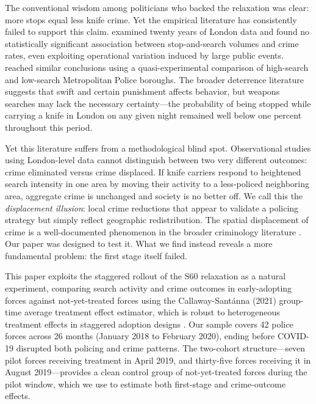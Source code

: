\documentclass[12pt]{article}
\begin{document}
The conventional wisdom among politicians who backed the relaxation was clear: more stops equal less knife crime. Yet the empirical literature has consistently failed to support this claim. \citet{tiratelli2018} examined twenty years of London data and found no statistically significant association between stop-and-search volumes and crime rates, even exploiting operational variation induced by large public events. \citet{mccandless2016} reached similar conclusions using a quasi-experimental comparison of high-search and low-search Metropolitan Police boroughs. The broader deterrence literature \citep{nagin2013, chalfin2018} suggests that swift and certain punishment affects behavior, but weapons searches may lack the necessary certainty---the probability of being stopped while carrying a knife in London on any given night remained well below one percent throughout this period.

Yet this literature suffers from a methodological blind spot. Observational studies using London-level data cannot distinguish between two very different outcomes: crime eliminated versus crime displaced. If knife carriers respond to heightened search intensity in one area by moving their activity to a less-policed neighboring area, aggregate crime is unchanged and society is no better off. We call this the \textit{displacement illusion}: local crime reductions that appear to validate a policing strategy but simply reflect geographic redistribution. The spatial displacement of crime is a well-documented phenomenon in the broader criminology literature \citep{weisburd2006, johnson2014}. Our paper was designed to test it. What we find instead reveals a more fundamental problem: the first stage itself failed.

This paper exploits the staggered rollout of the S60 relaxation as a natural experiment, comparing search activity and crime outcomes in early-adopting forces against not-yet-treated forces using the Callaway-Sant\'{a}nna (2021) group-time average treatment effect estimator, which is robust to heterogeneous treatment effects in staggered adoption designs \citep{callaway2021}. Our sample covers 42 police forces across 26 months (January 2018 to February 2020), ending before COVID-19 disrupted both policing and crime patterns. The two-cohort structure---seven pilot forces receiving treatment in April 2019, and thirty-five forces receiving it in August 2019---provides a clean control group of not-yet-treated forces during the pilot window, which we use to estimate both first-stage and crime-outcome effects.
\end{document}
